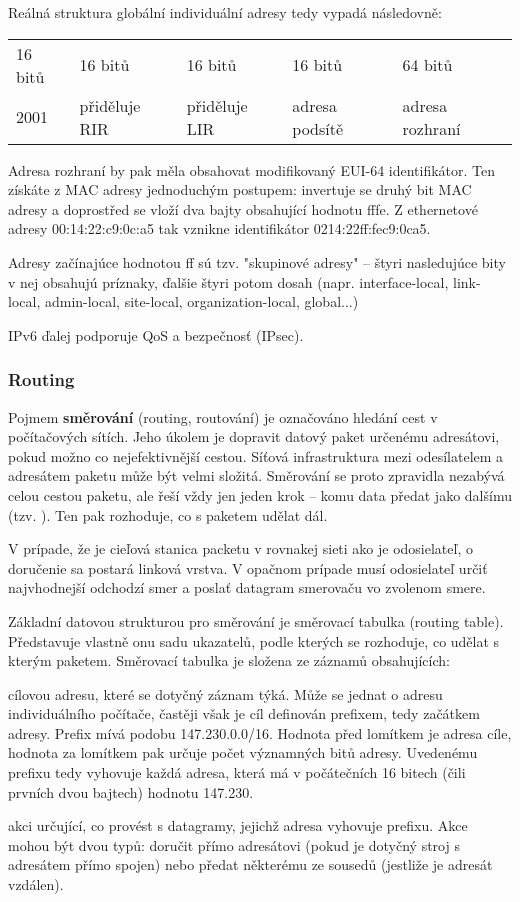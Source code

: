 Reálná struktura globální individuální adresy tedy vypadá následovně:

\begin{center}
\begin{tabular}{|l|l|l|l|l|}
	\hline
	16 bitů & 16 bitů & 16 bitů & 16 bitů & 64 bitů \\
	2001 & přiděluje RIR &přiděluje LIR &adresa podsítě & adresa rozhraní \\
	\hline
\end{tabular}
\end{center}
Adresa rozhraní by pak měla obsahovat modifikovaný EUI-64 identifikátor. Ten získáte z MAC adresy jednoduchým postupem: invertuje se druhý bit MAC adresy a doprostřed se vloží dva bajty obsahující hodnotu fffe. Z ethernetové adresy 00:14:22:c9:0c:a5 tak vznikne identifikátor 0214:22ff:fec9:0ca5.

Adresy začínajúce hodnotou ff sú tzv. "skupinové adresy" -- štyri nasledujúce bity v nej obsahujú príznaky, ďalšie štyri potom dosah (napr. interface-local, link-local, admin-local, site-local, organization-local, global...)

IPv6 ďalej podporuje QoS a bezpečnosť (IPsec).

\subsubsection*{Routing} 
Pojmem \textbf{směrování} (routing, routování) je označováno hledání cest v počítačových sítích. Jeho úkolem je dopravit datový paket určenému adresátovi, pokud možno co nejefektivnější cestou. Síťová infrastruktura mezi odesílatelem a adresátem paketu může být velmi složitá. Směrování se proto zpravidla nezabývá celou cestou paketu, ale řeší vždy jen jeden krok – komu data předat jako dalšímu (tzv. ). Ten pak rozhoduje, co s paketem udělat dál.

V prípade, že je cieľová stanica packetu v rovnakej sieti ako je odosielateľ, o doručenie sa postará linková vrstva. V opačnom prípade musí odosielateľ určiť najvhodnejší odchodzí smer a poslať datagram smerovaču vo zvolenom smere.

Základní datovou strukturou pro směrování je směrovací tabulka (routing table). Představuje vlastně onu sadu ukazatelů, podle kterých se rozhoduje, co udělat s kterým paketem. Směrovací tabulka je složena ze záznamů obsahujících:
\begin{pitemize}
	\item cílovou adresu, které se dotyčný záznam týká. Může se jednat o adresu individuálního počítače, častěji však je cíl definován prefixem, tedy začátkem adresy. Prefix mívá podobu 147.230.0.0/16. Hodnota před lomítkem je adresa cíle, hodnota za lomítkem pak určuje počet významných bitů adresy. Uvedenému prefixu tedy vyhovuje každá adresa, která má v počátečních 16 bitech (čili prvních dvou bajtech) hodnotu 147.230.
    \item akci určující, co provést s datagramy, jejichž adresa vyhovuje prefixu. Akce mohou být dvou typů: doručit přímo adresátovi (pokud je dotyčný stroj s adresátem přímo spojen) nebo předat některému ze sousedů (jestliže je adresát vzdálen).
\end{pitemize}

